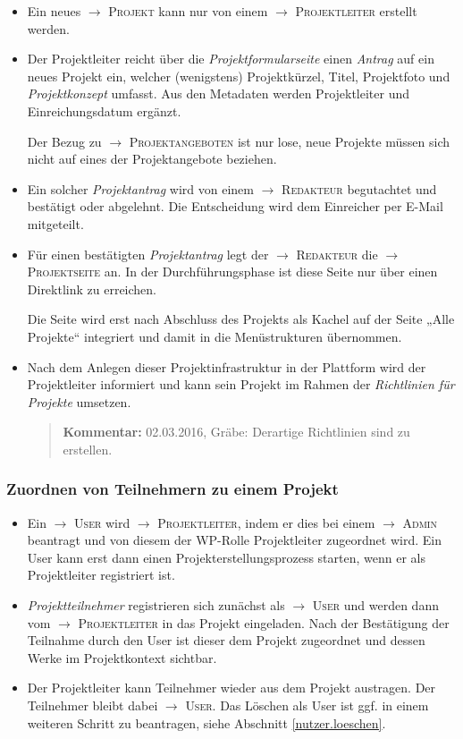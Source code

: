 \documentclass[a4paper,11pt]{article}
\newcommand{\Kommentar}[1]{
  \begin{quote}\textbf{Kommentar:} #1 \end{quote}
}
\newcommand{\glossar}[1]{{$\to$ \textsc{#1}}}
\begin{document}
\begin{itemize}
\item Ein neues \glossar{Projekt} kann nur von einem \glossar{Projektleiter}
  erstellt werden.
\item Der Projektleiter reicht über die \emph{Projektformularseite} einen
  \emph{Antrag} auf ein neues Projekt ein, welcher (wenigstens) Projektkürzel,
  Titel, Projektfoto und \emph{Projektkonzept} umfasst. Aus den Metadaten
  werden Projektleiter und Einreichungsdatum ergänzt.

  Der Bezug zu \glossar{Projektangeboten} ist nur lose, neue Projekte müssen
  sich nicht auf eines der Projektangebote beziehen.

\item Ein solcher \emph{Projektantrag} wird von einem \glossar{Redakteur}
  begutachtet und bestätigt oder abgelehnt.  Die Entscheidung wird dem
  Einreicher per E-Mail mitgeteilt. 

\item Für einen bestätigten \emph{Projektantrag} legt der \glossar{Redakteur}
  die \glossar{Projektseite} an.  In der Durchführungsphase ist diese Seite
  nur über einen Direktlink zu erreichen.

  Die Seite wird erst nach Abschluss des Projekts als Kachel auf der Seite
  „Alle Projekte“ integriert und damit in die Menüstrukturen übernommen.

\item Nach dem Anlegen dieser Projektinfrastruktur in der Plattform wird der
  Projektleiter informiert und kann sein Projekt im Rahmen der
  \emph{Richtlinien für Projekte} umsetzen. 

\Kommentar{02.03.2016, Gräbe: Derartige Richtlinien sind zu erstellen. }

\end{itemize}

\subsubsection{Zuordnen von Teilnehmern zu einem Projekt}

\begin{itemize}
\item Ein \glossar{User} wird \glossar{Projektleiter}, indem er dies bei einem
  \glossar{Admin} beantragt und von diesem der WP-Rolle Projektleiter
  zugeordnet wird.  Ein User kann erst dann einen Projekterstellungsprozess
  starten, wenn er als Projektleiter registriert ist.

\item \emph{Projektteilnehmer} registrieren sich zunächst als \glossar{User}
  und werden dann vom \glossar{Projektleiter} in das Projekt eingeladen.  Nach
  der Bestätigung der Teilnahme durch den User ist dieser dem Projekt
  zugeordnet und dessen Werke im Projektkontext sichtbar.  
\item Der Projektleiter kann Teilnehmer wieder aus dem Projekt austragen.  Der
  Teilnehmer bleibt dabei \glossar{User}.  Das Löschen als User ist ggf. in
  einem weiteren Schritt zu beantragen, siehe Abschnitt \ref{nutzer.loeschen}.  
\end{itemize}
\end{document}
